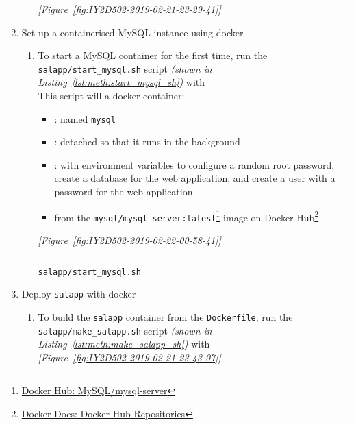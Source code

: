 \begin{enumerate}[leftmargin=0em,label=\protect\listlabelcircle{\arabic*}]
\begin{enumerate}[label=\Roman*~\textcolor{light-gray}{|}]
      \textcolor{deep-gray}{\textit{[Figure~\ref{fig:IY2D502-2019-02-21-23-29-41}]}}
    \end{enumerate}
  \item Set up a containerised MySQL instance using docker
    \begin{enumerate}[label=\Roman*~\textcolor{light-gray}{|}]
      \item To start a MySQL container for the first time, run the \texttt{salapp/start\_mysql.sh} script \textit{(shown in Listing~\ref{lst:meth:start_mysql_sh})} with \\
        This script will  a docker container:
        \begin{itemize}
          \item {}: named \texttt{mysql}
          \item {}: detached so that it runs in the background
          \item {}: with environment variables to configure a random root password, create a database for the web application, and create a user with a password for the web application
          \item from the \texttt{mysql/mysql-server:latest}\footnote{\href{https://hub.docker.com/r/mysql/mysql-server/}{Docker Hub: MySQL/mysql-server}} image on Docker Hub\footnote{\href{https://docs.docker.com/docker-hub/repos/}{Docker Docs: Docker Hub Repositories}}
        \end{itemize}
        \textcolor{deep-gray}{\textit{[Figure~\ref{fig:IY2D502-2019-02-22-00-58-41}]}}
        \begin{listing}[H]
          \captionsetup{skip=\skiplistingcaptionlen}
          \inputminted[breakanywhere]{bash}{../uswacs-2-iy2d502-salapp/start_mysql.sh}
          \caption{\texttt{salapp/start\_mysql.sh}}
          \label{lst:meth:start_mysql_sh}
        \end{listing}
    \end{enumerate}
  \pagebreak
  \item Deploy \texttt{salapp} with docker
    \begin{enumerate}[label=\Roman*~\textcolor{light-gray}{|}]
      \item To build the \texttt{salapp} container from the \texttt{Dockerfile}, run the \texttt{salapp/make\_salapp.sh} script \textit{(shown in Listing~\ref{lst:meth:make_salapp_sh})} with \\
        \textcolor{deep-gray}{\textit{[Figure~\ref{fig:IY2D502-2019-02-21-23-43-07}]}}\\

\end{enumerate}
\end{enumerate}
